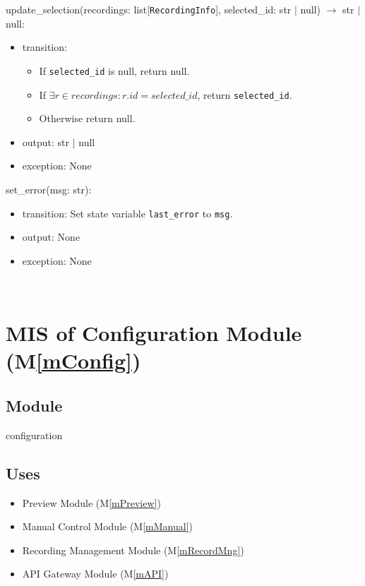 \documentclass[12pt, titlepage]{article}
\newcommand{\mref}[1]{M\ref{#1}}
\begin{document}
\noindent update\_selection(recordings: list[\texttt{RecordingInfo}], selected\_id: str $|$ null) $\rightarrow$ str $|$ null:
\begin{itemize}
  \item transition:
        \begin{itemize}
          \item If \texttt{selected\_id} is null, return null.
          \item If $\exists r \in recordings: r.id = selected\_id$, return
                \texttt{selected\_id}.
          \item Otherwise return null.
        \end{itemize}
  \item output: str $|$ null
  \item exception: None
\end{itemize}

\noindent set\_error(msg: str):
\begin{itemize}
  \item transition: Set state variable \texttt{last\_error} to \texttt{msg}.
  \item output: None
  \item exception: None
\end{itemize}

\ \

\section{MIS of Configuration Module (\mref{mConfig})}

\subsection{Module}

configuration

\subsection{Uses}

\begin{itemize}
  \item Preview Module (\mref{mPreview})
  \item Manual Control Module (\mref{mManual})
  \item Recording Management Module (\mref{mRecordMng})
  \item API Gateway Module (\mref{mAPI})
\end{itemize}
\end{document}
